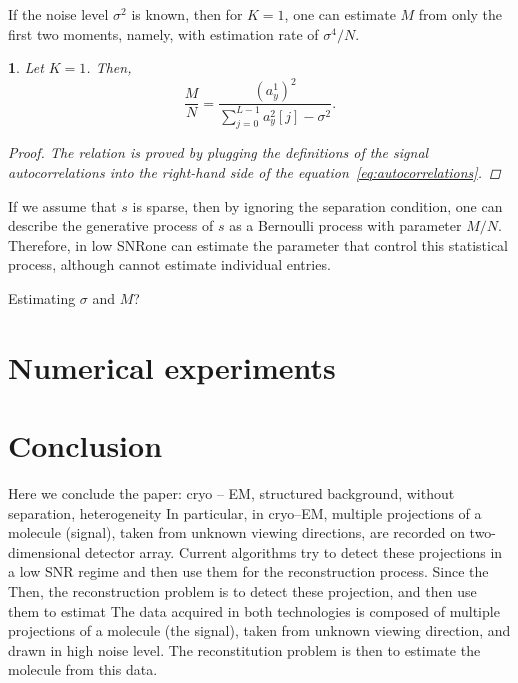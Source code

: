 \documentclass[english,11pt]{article}
\numberwithin{equation}{section}
\theoremstyle{plain}
\theoremstyle{definition}
\theoremstyle{remark}
\theoremstyle{plain}
\theoremstyle{remark}
\theoremstyle{plain}
\theoremstyle{plain}
\newtheorem{proposition}[thm]{\protect\propositionname}
\providecommand{\propositionname}{Proposition}
\newcommand{\SNR}{{\textsf{SNR}}}
\begin{document}
If the noise level $\sigma^2$ is known, then for $K=1$, one can estimate $M$ from only the first two moments, namely, with estimation rate of $\sigma^4/N$.
\begin{proposition}
	Let $K=1$. Then, 
	\begin{equation*}
	\frac{M}{N} = \frac{(a^1_y)^2}{\sum_{j=0}^{L-1}a_y^2[j]-\sigma^2}.
	\end{equation*}
	\begin{proof}
The relation is proved by plugging the definitions of the signal autocorrelations into the right-hand side of the equation~\eqref{eq:autocorrelations}. 	
\end{proof}
\end{proposition}

If we assume that $s$ is sparse, then by ignoring the separation condition, one can describe the generative process of $s$ as a Bernoulli process with parameter $M/N$. Therefore, in low \SNR  one can estimate the parameter that control this statistical process, although cannot estimate individual entries.

Estimating $\sigma$ and $M$? 


\section{Numerical experiments}   \label{sec:numerics}



\section{Conclusion} 
Here we conclude the paper: cryo -- EM, structured background, without separation, heterogeneity
In particular, in cryo--EM, multiple projections of a molecule (signal), taken
from unknown viewing directions, are recorded on two-dimensional detector
array. Current algorithms try to detect these projections in a low SNR regime
and then use them for the reconstruction process. Since the
Then, the reconstruction problem is to detect these projection, and then use
them to estimat
The data acquired in both technologies is composed of multiple projections
of a molecule (the signal), taken from unknown viewing direction, and drawn in
high noise level. The reconstitution problem is then to estimate the molecule
from this data.







\appendix
\end{document}
